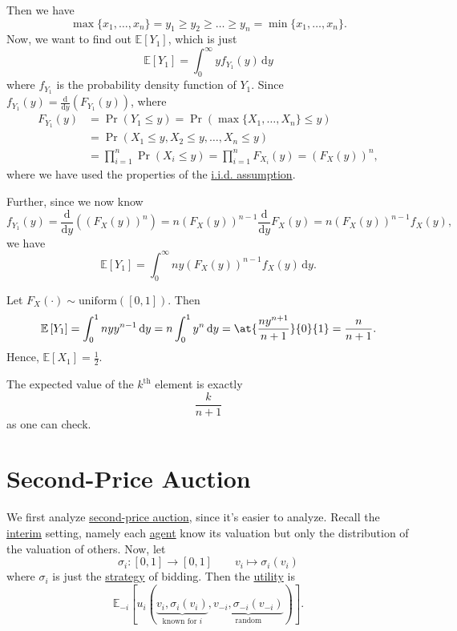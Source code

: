 Then we have
\[
	\max\{x_1, \dots , x_n\} = y_1\geq y_2\geq \dots \geq y_n = \min\{x_1, \dots , x_{n}\}.
\]
Now, we want to find out \(\mathbb{E}\left[Y_1 \right]\), which is just
\[
	\mathbb{E}\left[Y_1 \right] = \int_0^{\infty } y f_{Y_1}(y)\,\mathrm{d}y
\]
where \(f_{Y_1}\) is the probability density function of \(Y_1\). Since \(f_{Y_1}(y) = \frac{\mathrm{d}}{\mathrm{d}y} \left(F_{Y_1}(y)\right)\), where
\[
	\begin{split}
		F_{Y_1}(y) &= \Pr(Y_1\leq y)
		= \Pr(\max\{X_1, \dots , X_{n}\}\leq y)\\
		&= \Pr(X_1\leq y,X_2\leq y, \dots , X_n\leq y)\\
		&= \prod\limits_{i=1}^{n} \Pr(X_{i}\leq y)
		= \prod\limits_{i=1}^{n} F_{X_{i}}(y)
		= \left(F_X(y)\right)^n,
	\end{split}
\]
where we have used the properties of the \hyperref[def:i.i.d.]{i.i.d. assumption}.

Further, since we now know
\[
	f_{Y_1}(y) = \frac{\mathrm{d}}{\mathrm{d}y}\left(\left(F_X(y)\right)^n\right) = n \left(F_X(y)\right)^{n-1} \frac{\mathrm{d}}{\mathrm{d}y} F_X(y) = n\left(F_X (y)\right)^{n-1}f_X(y),
\]
we have
\[
	\mathbb{E}\left[Y_1 \right] = \int_0^{\infty }n y \left(F_{X}(y)\right)^{n-1} f_X(y)\,\mathrm{d}y.
\]

\begin{eg}
	Let \(F_{X}(\cdot)\sim \mathrm{uniform}([0,1]) \). Then
	\[
		\mathbb{E}\left[Y_1 \right] = \int_0^1 n y y^{n-1}\,\mathrm{d}y = n\int_0^1 y^n \,\mathrm{d}y = \at{\frac{ny^{n+1}}{n+1}}{0}{1} = \frac{n}{n+1} .
	\]
	Hence, \(\mathbb{E}\left[X_1 \right] = \frac{1}{2} \).
	\begin{remark}
		The expected value of the \(k^{\mathrm{th}}\) element is exactly
		\[
			\frac{k}{n+1}
		\]
		as one can check.
	\end{remark}
\end{eg}

\section{Second-Price Auction}
We first analyze \hyperref[eg:second-price-auction]{second-price auction}, since it's easier to analyze. Recall the \hyperref[def:interim]{interim} setting, namely each \hyperref[def:player]{agent} know its valuation but only the distribution of the valuation of others. Now, let
\[
	\sigma_{i}\colon [0, 1]\to [0, 1]\qquad v_{i}\mapsto  \sigma_{i}(v_{i})
\]
where \(\sigma_{i}\) is just the \hyperref[def:strategy]{strategy} of bidding. Then the \hyperref[def:reward]{utility} is
\[
	\mathbb{E}_{-i}\left[u_{i}(\underbrace{v_{i}, \sigma_{i}(v_{i})}_{\text{known for \(i\)}}, \underbrace{v_{-i}, \sigma_{-i}(v_{-i})}_{\text{random}}) \right] .
\]

